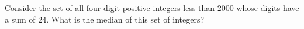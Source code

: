 Consider the set of all four-digit positive integers less than $2000$ whose digits have a sum of $24$. What is the median of this set of integers?
